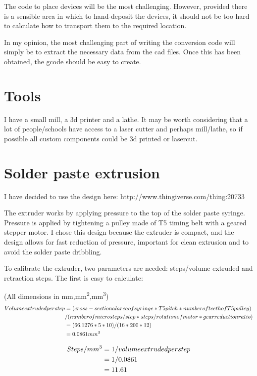 \documentclass[a4paper,11pt]{article}  %
\begin{document}
The code to place devices will be the most challenging. However, provided there is a sensible area in which to hand-deposit the devices, it should
not be too hard to calculate how to transport them to the required location.

In my opinion, the most challenging part of writing the conversion code will simply be to extract the necessary data from the cad files. Once this
has been obtained, the gcode should be easy to create.

\section{Tools}
I have a small mill, a 3d printer and a lathe. It may be worth considering that a lot of people/schools have
access to a laser cutter and perhaps mill/lathe, so if possible all custom components could be 3d printed or 
lasercut.

\section{Solder paste extrusion}
I have decided to use the design here: http://www.thingiverse.com/thing:20733

The extruder works by applying pressure to the top of the solder paste syringe. Pressure is applied by tightening a pulley made
of T5 timing belt with a geared stepper motor. I chose this design because the extruder is compact, and the design allows for
fast reduction of pressure, important for clean extrusion and to avoid the solder paste dribbling. 

To calibrate the extruder, two parameters are needed: steps/volume extruded and retraction steps. The first is easy to calculate:

(All dimensions in mm,mm\textsuperscript{2},mm\textsuperscript{3})
\begin{align}
	Volume extruded per step &= (cross-sectional area of syringe * T5 pitch * number of teeth of T5 pulley) \\&/ (number of microsteps/step * steps/rotation of motor * gear reduction ratio)\\
	&= (66.1276*5*10)/(16*200*12)\\
	&= 0.0861 mm\textsuperscript{3}\\
\end{align}

\begin{align}					 
	Steps/mm\textsuperscript{3} &= 1 / volume extruded per step\\
	&= 1 / 0.0861\\
	&= 11.61\\
\end{align}
\end{document}

